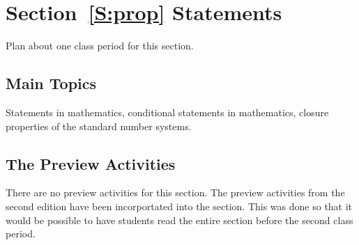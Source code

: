 \section*{Section~\ref{S:prop} Statements}  
Plan about one class period for this section.

\subsection*{Main Topics}
Statements in mathematics, conditional statements in mathematics, closure properties of the standard number systems.  

\subsection*{The Preview Activities}
There are no preview activities for this section.  The preview activities from the second edition have been incorportated into the section.  This was done so that it would be possible to have students read the entire section before the second class period.

%
\hbreak


